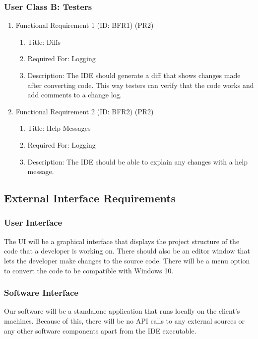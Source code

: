 \documentclass[12pt]{article}
\begin{document}
\subsubsection{User Class B: Testers}

\begin{enumerate}
    \item Functional Requirement 1 (ID: BFR1) (PR2)
    \begin{enumerate}
        \item Title: Diffs
        \item Required For: Logging
        \item Description: The IDE should generate a diff that shows changes made after converting code. This way testers can verify that
        the code works and add comments to a change log.
    \end{enumerate}
    \item Functional Requirement 2 (ID: BFR2) (PR2)
    \begin{enumerate}
        \item Title: Help Messages
        \item Required For: Logging
        \item Description: The IDE should be able to explain any changes with a help message.
    \end{enumerate}
\end{enumerate}

\subsection{External Interface Requirements}

\subsubsection{User Interface}

The UI will be a graphical interface that displays the project structure of the code that a developer is working on. There should
also be an editor window that lets the developer make changes to the source code. There will be a menu option to convert the code
to be compatible with Windows 10.

\subsubsection{Software Interface}

Our software will be a standalone application that runs locally on the client's machines. Because of this, there will be no API calls
to any external sources or any other software components apart from the IDE executable.
\end{document}
